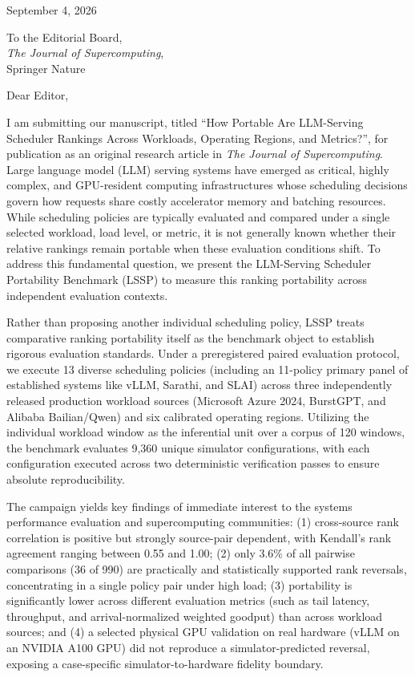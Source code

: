 \documentclass[10pt]{article}
\begin{document}
\begin{flushleft}
September 4, 2026
\end{flushleft}

\vspace{0.2cm}

\begin{flushleft}
To the Editorial Board,\\
\textit{The Journal of Supercomputing},\\
Springer Nature
\end{flushleft}

\vspace{0.2cm}

Dear Editor,

I am submitting our manuscript, titled ``How Portable Are LLM-Serving Scheduler Rankings Across Workloads, Operating Regions, and Metrics?'', for publication as an original research article in \textit{The Journal of Supercomputing}. Large language model (LLM) serving systems have emerged as critical, highly complex, and GPU-resident computing infrastructures whose scheduling decisions govern how requests share costly accelerator memory and batching resources. While scheduling policies are typically evaluated and compared under a single selected workload, load level, or metric, it is not generally known whether their relative rankings remain portable when these evaluation conditions shift. To address this fundamental question, we present the LLM-Serving Scheduler Portability Benchmark (LSSP) to measure this ranking portability across independent evaluation contexts.

Rather than proposing another individual scheduling policy, LSSP treats comparative ranking portability itself as the benchmark object to establish rigorous evaluation standards. Under a preregistered paired evaluation protocol, we execute 13 diverse scheduling policies (including an 11-policy primary panel of established systems like vLLM, Sarathi, and SLAI) across three independently released production workload sources (Microsoft Azure 2024, BurstGPT, and Alibaba Bailian/Qwen) and six calibrated operating regions. Utilizing the individual workload window as the inferential unit over a corpus of 120 windows, the benchmark evaluates 9,360 unique simulator configurations, with each configuration executed across two deterministic verification passes to ensure absolute reproducibility.

The campaign yields key findings of immediate interest to the systems performance evaluation and supercomputing communities: (1) cross-source rank correlation is positive but strongly source-pair dependent, with Kendall's rank agreement ranging between 0.55 and 1.00; (2) only 3.6\% of all pairwise comparisons (36 of 990) are practically and statistically supported rank reversals, concentrating in a single policy pair under high load; (3) portability is significantly lower across different evaluation metrics (such as tail latency, throughput, and arrival-normalized weighted goodput) than across workload sources; and (4) a selected physical GPU validation on real hardware (vLLM on an NVIDIA A100 GPU) did not reproduce a simulator-predicted reversal, exposing a case-specific simulator-to-hardware fidelity boundary.
\end{document}
